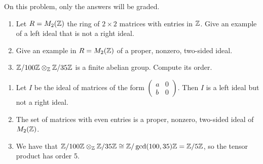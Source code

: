 %
\begin{question}[subtitle = August 2019 Problem 1,ID=Aug19_1]
On this problem, only the answers will be graded.
\begin{enumerate}
    \item Let $R = M_2(\mathbb{Z})$ the ring of $2 \times 2$ matrices with entries in $\mathbb{Z}$. Give an example of a left ideal that is not a right ideal.
    \item Give an example in $R = M_2(\mathbb{Z})$ of a proper, nonzero, two-sided ideal.
    \item $\mathbb{Z}/100\mathbb{Z} \otimes_{\mathbb{Z}} \mathbb{Z}/35\mathbb{Z}$ is a finite abelian group. Compute its order.
\end{enumerate}
\end{question}
\begin{solution}
\begin{enumerate}
    \item Let $I$ be the ideal of matrices of the form $\begin{pmatrix} a & 0\\ b & 0\end{pmatrix}$. Then $I$ is a left ideal but not a right ideal.
    \item The set of matrices with even entries is a proper, nonzero, two-sided ideal of $M_2(\mathbb{Z})$.
    \item We have that $\mathbb{Z}/100\mathbb{Z} \otimes_{\mathbb{Z}} \mathbb{Z}/35\mathbb{Z} \cong \mathbb{Z}/\gcd(100,35)\mathbb{Z} = \mathbb{Z}/5\mathbb{Z}$, so the tensor product has order 5.
\end{enumerate}
\end{solution}

